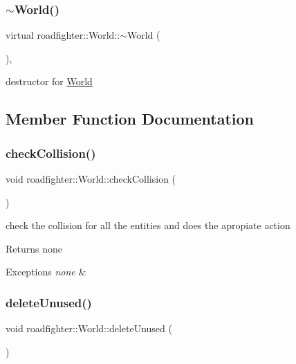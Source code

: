 \subsubsection{\texorpdfstring{$\sim$\+World()}{~World()}}
{\footnotesize\ttfamily virtual roadfighter\+::\+World\+::$\sim$\+World (\begin{DoxyParamCaption}{ }\end{DoxyParamCaption})\hspace{0.3cm}{\ttfamily [virtual]}, {\ttfamily [default]}}

destructor for \hyperlink{classroadfighter_1_1World}{World} 

\subsection{Member Function Documentation}
\mbox{\label{classroadfighter_1_1World_ad04348a1285e8246abfacf32b600866f}} 
\subsubsection{\texorpdfstring{check\+Collision()}{checkCollision()}}
{\footnotesize\ttfamily void roadfighter\+::\+World\+::check\+Collision (\begin{DoxyParamCaption}{ }\end{DoxyParamCaption})}

check the collision for all the entities and does the apropiate action \begin{DoxyReturn}{Returns}
none 
\end{DoxyReturn}

\begin{DoxyExceptions}{Exceptions}
{\em none} & \\
\hline
\end{DoxyExceptions}
\mbox{\label{classroadfighter_1_1World_af7b77b0be8fee9e26093e2990f3889aa}} 
\subsubsection{\texorpdfstring{delete\+Unused()}{deleteUnused()}}
{\footnotesize\ttfamily void roadfighter\+::\+World\+::delete\+Unused (\begin{DoxyParamCaption}{ }\end{DoxyParamCaption})}

